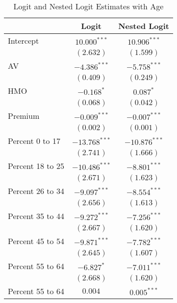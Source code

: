 
\begin{table}
\caption{Logit and Nested Logit Estimates with Age}
\begin{center}
\begin{tabular}{l c c}
\hline
 & Logit & Nested Logit \\
\hline
Intercept                      & $10.000^{***}$  & $10.906^{***}$  \\
                               & $(2.632)$       & $(1.599)$       \\
AV                             & $-4.386^{***}$  & $-5.758^{***}$  \\
                               & $(0.409)$       & $(0.249)$       \\
HMO                            & $-0.168^{*}$    & $0.087^{*}$     \\
                               & $(0.068)$       & $(0.042)$       \\
Premium                        & $-0.009^{***}$  & $-0.007^{***}$  \\
                               & $(0.002)$       & $(0.001)$       \\
Percent 0 to 17                & $-13.768^{***}$ & $-10.876^{***}$ \\
                               & $(2.741)$       & $(1.666)$       \\
Percent 18 to 25               & $-10.486^{***}$ & $-8.801^{***}$  \\
                               & $(2.671)$       & $(1.623)$       \\
Percent 26 to 34               & $-9.097^{***}$  & $-8.554^{***}$  \\
                               & $(2.656)$       & $(1.613)$       \\
Percent 35 to 44               & $-9.272^{***}$  & $-7.256^{***}$  \\
                               & $(2.667)$       & $(1.620)$       \\
Percent 45 to 54               & $-9.871^{***}$  & $-7.782^{***}$  \\
                               & $(2.645)$       & $(1.607)$       \\
Percent 55 to 64               & $-6.827^{*}$    & $-7.011^{***}$  \\
                               & $(2.668)$       & $(1.620)$       \\
Percent 55 to 64               & $0.004$         & $0.005^{***}$   \\

\end{tabular}
\end{center}
\end{table}
